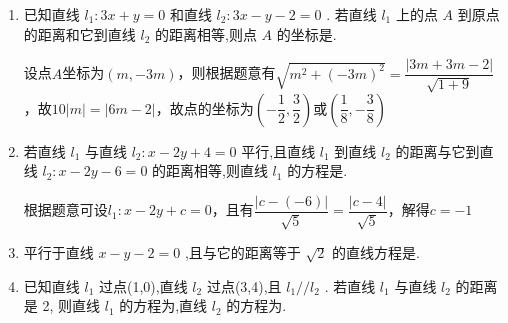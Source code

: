 \begin{enumerate}
\begin{jieda}
\begin{enumerate}
            $\vv{AC} = \left(-\dfrac{1}{2}, \dfrac{1}{2}\right), \vv{AB} = (1, 2)$，故$S = \left|-\dfrac{1}{2} \times 2 - \dfrac{1}{2} \times 1\right| = \dfrac{3}{2}$
        \end{enumerate}
    \end{jieda}
    
    \item 已知直线 ${l}_{1} : {3x} + y = 0$ 和直线 ${l}_{2} : {3x} - y - 2 = 0$ . 若直线 ${l}_{1}$ 上的点 $A$ 到原点的距离和它到直线 ${l}_{2}$ 的距离相等,则点 $A$ 的坐标是.
    
    \begin{jieda}
        设点$A$坐标为$(m, -3m)$，则根据题意有$\sqrt{m^2+(-3m)^2} = \dfrac{|3m + 3m - 2|}{\sqrt{1+9}}$，故$10|m| = |6m-2|$，故点的坐标为$\left(-\dfrac{1}{2}, \dfrac{3}{2}\right)$或$\left(\dfrac{1}{8}, -\dfrac{3}{8}\right)$
    \end{jieda}

    \item 若直线 ${l}_{1}$ 与直线 ${l}_{2} : x - {2y} + 4 = 0$ 平行,且直线 ${l}_{1}$ 到直线 ${l}_{2}$ 的距离与它到直线 ${l}_{2} : x - {2y} - 6 = 0$ 的距离相等,则直线 ${l}_{1}$ 的方程是.
    \begin{jieda}
        根据题意可设${l}_{1}: x-2y+c=0$，且有$\dfrac{|c-(-6)|}{\sqrt{5}} = \dfrac{|c-4|}{\sqrt{5}}$，解得$c = -1$
    \end{jieda}

    \item 平行于直线 $x - y - 2 = 0$ ,且与它的距离等于 $\sqrt{2}$ 的直线方程是.

    \item 已知直线 ${l}_{1}$ 过点(1,0),直线 ${l}_{2}$ 过点(3,4),且 ${l}_{1}//{l}_{2}$ . 若直线 ${l}_{1}$ 与直线 ${l}_{2}$ 的距离是 2, 则直线 ${l}_{1}$ 的方程为,直线 ${l}_{2}$ 的方程为.
    \begin{jieda}
    \end{jieda}


\end{enumerate}
